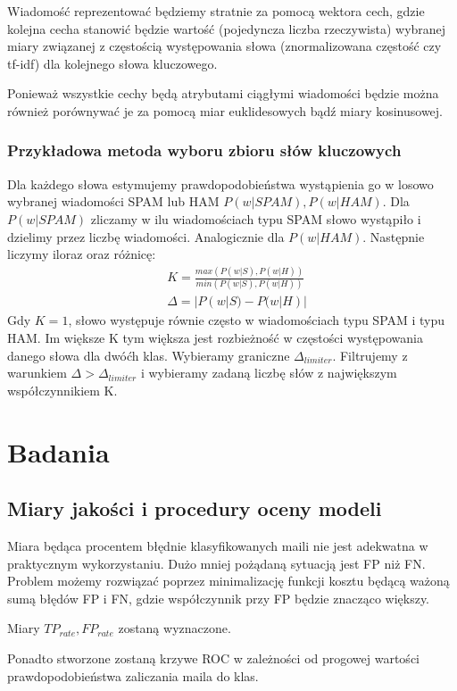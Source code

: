 \documentclass[fleqn]{article}
\begin{document}
Wiadomość reprezentować będziemy stratnie za pomocą wektora cech, gdzie kolejna cecha stanowić będzie wartość (pojedyncza liczba rzeczywista) wybranej miary związanej z częstością występowania słowa (znormalizowana częstość czy tf-idf) dla kolejnego słowa kluczowego. 

Ponieważ wszystkie cechy będą atrybutami ciągłymi wiadomości będzie można również porównywać je
za pomocą miar euklidesowych bądź miary kosinusowej.

\subsubsection{Przykładowa metoda wyboru zbioru słów kluczowych}
Dla każdego słowa estymujemy prawdopodobieństwa wystąpienia go w losowo wybranej wiadomości SPAM lub HAM $P(w|SPAM), P(w|HAM)$. Dla $P(w|SPAM)$ zliczamy w ilu wiadomościach typu SPAM słowo wystąpiło i dzielimy przez liczbę wiadomości. Analogicznie dla $P(w|HAM)$. Następnie liczymy iloraz oraz różnicę:
\begin{align*}
    &K = \frac {max(  P(w|S), P(w|H)  )}{min(  P(w|S), P(w|H)  )} \\
    &\Delta = | P(w|S) - P(w|H) |
\end{align*}
Gdy $K=1$, słowo występuje równie często w wiadomościach typu SPAM i typu HAM. Im większe K tym większa jest rozbieżność w częstości występowania danego słowa dla dwóćh klas.
Wybieramy graniczne $\Delta_{limiter}$. Filtrujemy z warunkiem $\Delta > \Delta_{limiter}$ i wybieramy zadaną liczbę słów z największym współczynnikiem K.






\section{Badania}
\subsection {Miary jakości i procedury oceny modeli}
Miara będąca procentem błędnie klasyfikowanych maili nie jest adekwatna w praktycznym wykorzystaniu. Dużo mniej pożądaną sytuacją jest FP niż FN. Problem możemy rozwiązać poprzez minimalizację funkcji kosztu będącą ważoną sumą błędów FP i FN, gdzie współczynnik przy FP będzie znacząco większy.

Miary $TP_{rate}, FP_{rate}$ zostaną wyznaczone.

Ponadto stworzone zostaną krzywe ROC w zależności od progowej wartości prawdopodobieństwa zaliczania maila do klas. 
\end{document}
